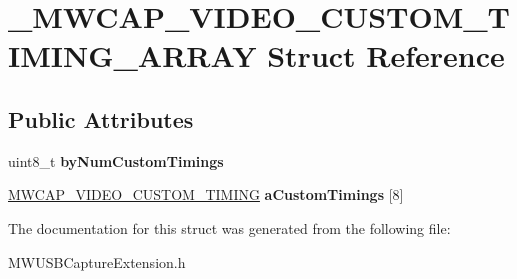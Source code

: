 \hypertarget{struct__MWCAP__VIDEO__CUSTOM__TIMING__ARRAY}{\section{\-\_\-\-M\-W\-C\-A\-P\-\_\-\-V\-I\-D\-E\-O\-\_\-\-C\-U\-S\-T\-O\-M\-\_\-\-T\-I\-M\-I\-N\-G\-\_\-\-A\-R\-R\-A\-Y Struct Reference}
\label{struct__MWCAP__VIDEO__CUSTOM__TIMING__ARRAY}
}
\subsection*{Public Attributes}
\begin{DoxyCompactItemize}
\item 
\hypertarget{struct__MWCAP__VIDEO__CUSTOM__TIMING__ARRAY_afd88ae5df1e2b78aa58efa215b9af897}{uint8\-\_\-t {\bfseries by\-Num\-Custom\-Timings}}\label{struct__MWCAP__VIDEO__CUSTOM__TIMING__ARRAY_afd88ae5df1e2b78aa58efa215b9af897}

\item 
\hypertarget{struct__MWCAP__VIDEO__CUSTOM__TIMING__ARRAY_a3450c2644b3b7783122016ebf8dd1af0}{\hyperlink{struct__MWCAP__VIDEO__CUSTOM__TIMING}{M\-W\-C\-A\-P\-\_\-\-V\-I\-D\-E\-O\-\_\-\-C\-U\-S\-T\-O\-M\-\_\-\-T\-I\-M\-I\-N\-G} {\bfseries a\-Custom\-Timings} \mbox{[}8\mbox{]}}\label{struct__MWCAP__VIDEO__CUSTOM__TIMING__ARRAY_a3450c2644b3b7783122016ebf8dd1af0}

\end{DoxyCompactItemize}


The documentation for this struct was generated from the following file\-:\begin{DoxyCompactItemize}
\item 
M\-W\-U\-S\-B\-Capture\-Extension.\-h\end{DoxyCompactItemize}
